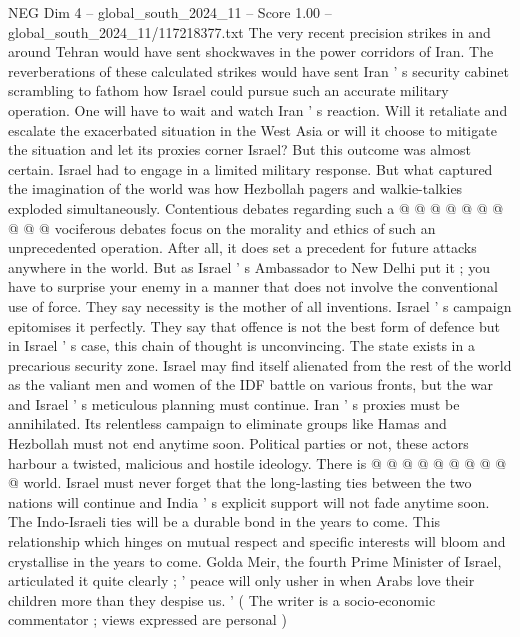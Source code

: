 \begin{textsample}{NEG Dim 4 – global\_south\_2024\_11 – Score 1.00 – global\_south\_2024\_11/117218377.txt}
The very recent precision strikes in and around Tehran would have sent shockwaves in the power corridors of Iran.
The reverberations of these calculated strikes would have sent Iran ' s security cabinet scrambling to fathom how Israel could pursue such an accurate military operation.
One will have to wait and watch Iran ' s reaction.
Will it retaliate and escalate the exacerbated situation in the West Asia or will it choose to mitigate the situation and let its proxies corner Israel?
But this outcome was almost certain.
Israel had to engage in a limited military response.
But what captured the imagination of the world was how Hezbollah pagers and walkie-talkies exploded simultaneously.
Contentious debates regarding such a @ @ @ @ @ @ @ @ @ @ vociferous debates focus on the morality and ethics of such an unprecedented operation.
After all, it does set a precedent for future attacks anywhere in the world.
But as Israel ' s Ambassador to New Delhi put it ; you have to surprise your enemy in a manner that does not involve the conventional use of force.
They say necessity is the mother of all inventions.
Israel ' s campaign epitomises it perfectly.
They say that offence is not the best form of defence but in Israel ' s case, this chain of thought is unconvincing.
The state exists in a precarious security zone.
Israel may find itself alienated from the rest of the world as the valiant men and women of the IDF battle on various fronts, but the war and Israel ' s meticulous planning must continue.
Iran ' s proxies must be annihilated.
Its relentless campaign to eliminate groups like Hamas and Hezbollah must not end anytime soon.
Political parties or not, these actors harbour a twisted, malicious and hostile ideology.
There is @ @ @ @ @ @ @ @ @ @ world.
Israel must never forget that the long-lasting ties between the two nations will continue and India ' s explicit support will not fade anytime soon.
The Indo-Israeli ties will be a durable bond in the years to come.
This relationship which hinges on mutual respect and specific interests will bloom and crystallise in the years to come.
Golda Meir, the fourth Prime Minister of Israel, articulated it quite clearly ; ' peace will only usher in when Arabs love their children more than they despise us. ' ( The writer is a socio-economic commentator ; views expressed are personal )

\end{textsample}
